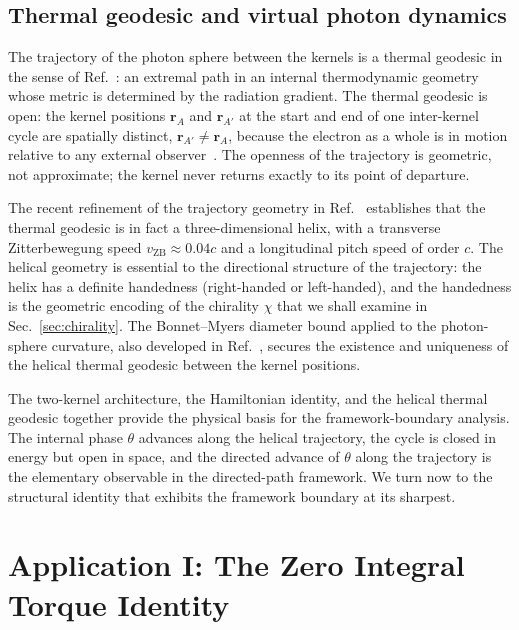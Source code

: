 \documentclass[%
 reprint, amsmath,amssymb, aps, prb, ]{revtex4-2}
\numberwithin{equation}{section}
\begin{document}
\subsection{Thermal geodesic and virtual photon dynamics}
\label{sec:thermal_geodesic}

The trajectory of the photon sphere between the kernels is a thermal geodesic in the sense of Ref.~\cite{hanamura24}: an extremal path in an internal thermodynamic geometry whose metric is determined by the radiation gradient. The thermal geodesic is open: the kernel positions $\mathbf{r}_A$ and $\mathbf{r}_{A'}$ at the start and end of one inter-kernel cycle are spatially distinct, $\mathbf{r}_{A'} \neq \mathbf{r}_A$, because the electron as a whole is in motion relative to any external observer~\cite{hanamura47}. The openness of the trajectory is geometric, not approximate; the kernel never returns exactly to its point of departure.

The recent refinement of the trajectory geometry in Ref.~\cite{hanamura51} establishes that the thermal geodesic is in fact a three-dimensional helix, with a transverse Zitterbewegung speed $v_{\mathrm{ZB}} \approx 0.04 c$ and a longitudinal pitch speed of order $c$. The helical geometry is essential to the directional structure of the trajectory: the helix has a definite handedness (right-handed or left-handed), and the handedness is the geometric encoding of the chirality $\chi$ that we shall examine in Sec.~\ref{sec:chirality}. The Bonnet--Myers diameter bound applied to the photon-sphere curvature, also developed in Ref.~\cite{hanamura51}, secures the existence and uniqueness of the helical thermal geodesic between the kernel positions.

The two-kernel architecture, the Hamiltonian identity, and the helical thermal geodesic together provide the physical basis for the framework-boundary analysis. The internal phase $\theta$ advances along the helical trajectory, the cycle is closed in energy but open in space, and the directed advance of $\theta$ along the trajectory is the elementary observable in the directed-path framework. We turn now to the structural identity that exhibits the framework boundary at its sharpest.


\section{Application I: The Zero Integral Torque Identity}
\label{sec:zerotorque}
\end{document}
